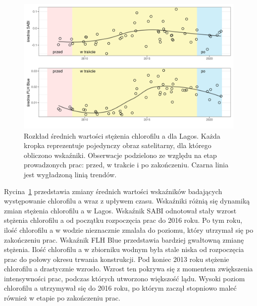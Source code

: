\documentclass{amuthesis}
\begin{document}
\begin{figure}[t]

{\centering \includegraphics[width=6.25in,height=\textheight]{figures/nigeria/sabi_flhblue_means.png}

}

\caption{\label{fig-ng_sabi_flhblue_means}Rozkład średnich wartości
stężenia chlorofilu a dla Lagos. Każda kropka reprezentuje pojedynczy
obraz satelitarny, dla którego obliczono wskaźniki. Obserwacje
podzielono ze względu na etap prowadzonych prac: przed, w trakcie i po
zakończeniu. Czarna linia jest wygładzoną linią trendów.}

\end{figure}

Rycina~\ref{fig-ng_sabi_flhblue_means} przedstawia zmiany średnich
wartości wskaźników badających występowanie chlorofilu a wraz z upływem
czasu. Wskaźniki różnią się dynamiką zmian stężenia chlorofilu a w
Lagos. Wskaźnik SABI odnotował stały wzrost stężenia chlorofilu a od
początku rozpoczęcia prac do 2016 roku. Po tym roku, ilość chlorofilu a
w wodzie nieznacznie zmalała do poziomu, który utrzymał się po
zakończeniu prac. Wskaźnik FLH Blue przedstawia bardziej gwałtowną
zmianę stężenia. Ilość chlorofilu a w zbiorniku wodnym była stale niska
od rozpoczęcia prac do połowy okresu trwania konstrukcji. Pod koniec
2013 roku stężenie chlorofilu a drastycznie wzrosło. Wzrost ten pokrywa
się z momentem zwiększenia intensywności prac, podczas których utworzono
większość lądu. Wysoki poziom chlorofilu a utrzymywał się do 2016 roku,
po którym zaczął stopniowo maleć również w etapie po zakończeniu prac.
\end{document}
